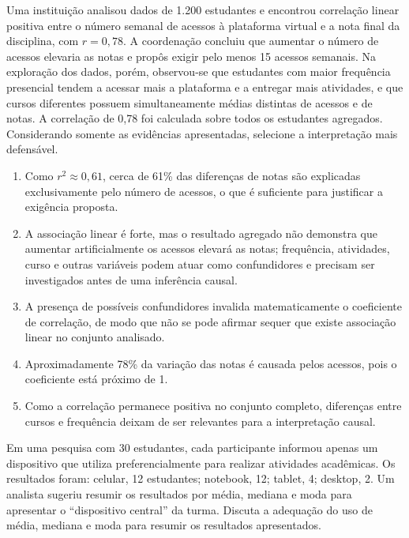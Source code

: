 \documentclass[12pt,a4paper]{article}
\begin{document}
\TextoBase
Uma instituição analisou dados de 1.200 estudantes e encontrou correlação linear positiva entre o número semanal de acessos à plataforma virtual e a nota final da disciplina, com $r=0{,}78$. A coordenação concluiu que aumentar o número de acessos elevaria as notas e propôs exigir pelo menos 15 acessos semanais. Na exploração dos dados, porém, observou-se que estudantes com maior frequência presencial tendem a acessar mais a plataforma e a entregar mais atividades, e que cursos diferentes possuem simultaneamente médias distintas de acessos e de notas. A correlação de 0,78 foi calculada sobre todos os estudantes agregados.
\FonteDidatica
\Comando Considerando somente as evidências apresentadas, selecione a interpretação mais defensável.
\begin{enumerate}[label=\Alph*)]
\item Como $r^2\approx0{,}61$, cerca de 61\% das diferenças de notas são explicadas exclusivamente pelo número de acessos, o que é suficiente para justificar a exigência proposta.
\item A associação linear é forte, mas o resultado agregado não demonstra que aumentar artificialmente os acessos elevará as notas; frequência, atividades, curso e outras variáveis podem atuar como confundidores e precisam ser investigados antes de uma inferência causal.
\item A presença de possíveis confundidores invalida matematicamente o coeficiente de correlação, de modo que não se pode afirmar sequer que existe associação linear no conjunto analisado.
\item Aproximadamente 78\% da variação das notas é causada pelos acessos, pois o coeficiente está próximo de 1.
\item Como a correlação permanece positiva no conjunto completo, diferenças entre cursos e frequência deixam de ser relevantes para a interpretação causal.
\end{enumerate}

\TextoBase
Em uma pesquisa com 30 estudantes, cada participante informou apenas um dispositivo que utiliza preferencialmente para realizar atividades acadêmicas. Os resultados foram: celular, 12 estudantes; notebook, 12; tablet, 4; desktop, 2. Um analista sugeriu resumir os resultados por média, mediana e moda para apresentar o ``dispositivo central'' da turma.
\FonteDidatica
\Comando Discuta a adequação do uso de média, mediana e moda para resumir os resultados apresentados.
\EspacoDiscursiva
\end{document}
